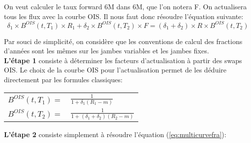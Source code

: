 \documentclass{article}
\begin{document}
On veut calculer le taux forward 6M dans 6M, que l'on notera F. On actualisera tous les flux avec la courbe OIS. Il nous faut donc résoudre l'équation suivante:\\
\begin{equation}
\label{eq:multicurvefra}
\delta_1 \times B^{OIS}(t,T_1) \times R_1 + \delta_2 \times B^{OIS}(t,T_2) \times F = (\delta_1 + \delta_2) \times R \times B^{OIS}(t,T_2)
\end{equation}

Par souci de simplicité, on considère que les conventions de calcul des fractions d'années sont les mêmes sur les jambes variables et les jambes fixes.\\

\textbf{L'étape 1} consiste à déterminer les facteurs d'actualisation à partir des swaps OIS. Le choix de la courbe OIS pour l'actualisation permet de les déduire directement par les formules classiques: 

\begin{center}
\begin{tabular}{r l}
$B^{OIS}(t,T_1)=$ & $\frac{1}{1+\delta_1 (R_1-m)}$ \\
$B^{OIS}(t,T_2)=$ & $\frac{1}{1+(\delta_1 + \delta_2) (R_2-m)}$ \\
\end{tabular}
\end{center}

\textbf{L'étape 2} consiste simplement à résoudre l'équation (\ref{eq:multicurvefra}):\\
\end{document}
